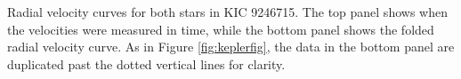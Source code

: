 \label{fig:rvfig} Radial velocity curves for both stars in KIC 9246715. The top panel shows when the velocities were measured in time, while the bottom panel shows the folded radial velocity curve. As in Figure \ref{fig:keplerfig}, the data in the bottom panel are duplicated past the dotted vertical lines for clarity.